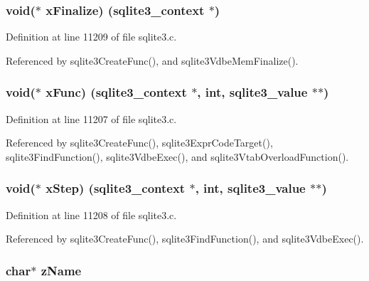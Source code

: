 \subsubsection[{x\+Finalize}]{\setlength{\rightskip}{0pt plus 5cm}void($\ast$ x\+Finalize) ({\bf sqlite3\+\_\+context} $\ast$)}\label{struct_func_def_a41e296d3e0af2a6f7c80c94139988e77}


Definition at line 11209 of file sqlite3.\+c.



Referenced by sqlite3\+Create\+Func(), and sqlite3\+Vdbe\+Mem\+Finalize().

\hypertarget{struct_func_def_a0ab77577dd4a4a51c4182b9ca4c72c36}{}
\subsubsection[{x\+Func}]{\setlength{\rightskip}{0pt plus 5cm}void($\ast$ x\+Func) ({\bf sqlite3\+\_\+context} $\ast$, int, sqlite3\+\_\+value $\ast$$\ast$)}\label{struct_func_def_a0ab77577dd4a4a51c4182b9ca4c72c36}


Definition at line 11207 of file sqlite3.\+c.



Referenced by sqlite3\+Create\+Func(), sqlite3\+Expr\+Code\+Target(), sqlite3\+Find\+Function(), sqlite3\+Vdbe\+Exec(), and sqlite3\+Vtab\+Overload\+Function().

\hypertarget{struct_func_def_a47b7ab6a7f27a9fa11ecf8105df6b32c}{}
\subsubsection[{x\+Step}]{\setlength{\rightskip}{0pt plus 5cm}void($\ast$ x\+Step) ({\bf sqlite3\+\_\+context} $\ast$, int, sqlite3\+\_\+value $\ast$$\ast$)}\label{struct_func_def_a47b7ab6a7f27a9fa11ecf8105df6b32c}


Definition at line 11208 of file sqlite3.\+c.



Referenced by sqlite3\+Create\+Func(), sqlite3\+Find\+Function(), and sqlite3\+Vdbe\+Exec().

\hypertarget{struct_func_def_a661118d86ac4127d40bf3be78d92117d}{}
\subsubsection[{z\+Name}]{\setlength{\rightskip}{0pt plus 5cm}char$\ast$ z\+Name}\label{struct_func_def_a661118d86ac4127d40bf3be78d92117d}



